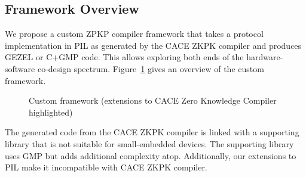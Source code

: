 
\subsection{Framework Overview}
\label{frameworkoverview}
We propose a custom ZPKP compiler framework that takes a protocol
implementation in PIL as generated by the CACE ZKPK compiler and
produces GEZEL or C+GMP code. This allows exploring both ends of the
hardware-software co-design spectrum.
Figure~\ref{fig:custom_framework_workflow} gives an overview of the
custom framework.

\begin{figure}[hb!]
  \centering
  \caption{Custom framework (extensions to CACE Zero Knowledge
    Compiler highlighted)}
  \label{fig:custom_framework_workflow}
\end{figure}

The generated code from the CACE ZKPK compiler is linked with a
supporting library that is not suitable for small-embedded
devices. The supporting library uses GMP but adds additional
complexity atop. Additionally, our extensions to PIL make it
incompatible with CACE ZKPK compiler.

